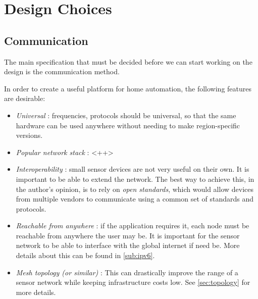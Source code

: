 \chapter{Design Choices}\label{ch:choices}

\section{Communication}\label{sec:communication}

The main specification that must be decided before we can start working on the
design is the communication method.


In order to create a useful platform for home automation, the following features
are desirable:

\begin{itemize}
  \item \emph{Universal} : frequencies, protocols should be universal, so that
    the same hardware can be used anywhere without needing to make
    region-specific versions.

  \item \emph{Popular network stack} : <++>

  \item \emph{Interoperability} : small sensor devices are not very useful on
    their own. It is important to be able to extend the network. The best way to
    achieve this, in the author's opinion, is to rely on \emph{open standards},
    which would allow devices from multiple vendors to communicate using
    a common set of standards and protocols. 

  \item \emph{Reachable from anywhere} : if the application requires it, each
    node must be reachable from anywhere the user may be. It is important for
    the sensor network to be able to interface with the global internet if need
    be. More details about this can be found in \autoref{sub:ipv6}.
  \item \emph{Mesh topology (or similar)} : This can drastically improve the
    range of a sensor network while keeping infrastructure costs low. See
    \autoref{sec:topology} for more details.
\end{itemize}

